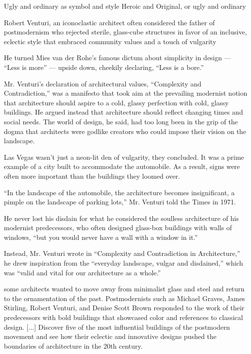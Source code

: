     Ugly and ordinary as symbol and style
    Heroic and Original, or ugly and ordinary

    Robert Venturi, an iconoclastic architect often considered the father of postmodernism who rejected sterile, glass-cube structures in favor of an inclusive, eclectic style that embraced community values and a touch of vulgarity\cite{Schudel2018}

    He turned Mies van der Rohe’s famous dictum about simplicity in design — “Less is more” — upside down, cheekily declaring, “Less is a bore.”\cite{Schudel2018}

    Mr. Venturi’s declaration of architectural values, “Complexity and Contradiction,” was a manifesto that took aim at the prevailing modernist notion that architecture should aspire to a cold, glassy perfection with cold, glassy buildings.
    He argued instead that architecture should reflect changing times and social needs.
    The world of design, he said, had too long been in the grip of the dogma that architects were godlike creators who could impose their vision on the landscape.\cite{Schudel2018}

     Las Vegas wasn’t just a neon-lit den of vulgarity, they concluded.
     It was a prime example of a city built to accommodate the automobile.
     As a result, signs were often more important than the buildings they loomed over.\cite{Schudel2018}

    “In the landscape of the automobile, the architecture becomes insignificant, a pimple on the landscape of parking lots,” Mr. Venturi told the Times in 1971.\cite{Schudel2018}

    He never lost his disdain for what he considered the soulless architecture of his modernist predecessors, who often designed glass-box buildings with walls of windows, “but you would never have a wall with a window in it.”\cite{Schudel2018}

    Instead, Mr. Venturi wrote in “Complexity and Contradiction in Architecture,” he drew inspiration from the “everyday landscape, vulgar and disdained,” which was “valid and vital for our architecture as a whole.”\cite{Schudel2018}

    some architects wanted to move away from minimalist glass and steel and return to the ornamentation of the past. Postmodernists such as Michael Graves, James Stirling, Robert Venturi, and Denise Scott Brown responded to the work of their predecessors with bold buildings that showcased color and references to classical design. [...] Discover five of the most influential buildings of the postmodern movement and see how their eclectic and innovative designs pushed the boundaries of architecture in the 20th century\cite{Stamp2016}.


